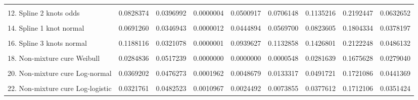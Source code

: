 \documentclass[]{article}
\begin{document}
\begin{table}
\begin{tabular}[t]{lrrrrrrrr}
\cellcolor{gray!6}{11. Spline 1 knot odds} & \cellcolor{gray!6}{0.0602433} & \cellcolor{gray!6}{0.0377595} & \cellcolor{gray!6}{0.0004610} & \cellcolor{gray!6}{0.0331955} & \cellcolor{gray!6}{0.0461415} & \cellcolor{gray!6}{0.0743721} & \cellcolor{gray!6}{0.1809477} & \cellcolor{gray!6}{0.0410625}\\
12. Spline 2 knots odds & 0.0828374 & 0.0396992 & 0.0000004 & 0.0500917 & 0.0706148 & 0.1135216 & 0.2192447 & 0.0632652\\
\cellcolor{gray!6}{13. Spline 3 knots odds} & \cellcolor{gray!6}{0.0937702} & \cellcolor{gray!6}{0.0420449} & \cellcolor{gray!6}{0.0000052} & \cellcolor{gray!6}{0.0581364} & \cellcolor{gray!6}{0.0821832} & \cellcolor{gray!6}{0.1255993} & \cellcolor{gray!6}{0.2117141} & \cellcolor{gray!6}{0.0672824}\\
14. Spline 1 knot normal & 0.0691260 & 0.0346943 & 0.0000012 & 0.0444894 & 0.0569700 & 0.0823605 & 0.1804334 & 0.0378197\\
\cellcolor{gray!6}{15. Spline 2 knots normal} & \cellcolor{gray!6}{0.0933942} & \cellcolor{gray!6}{0.0319718} & \cellcolor{gray!6}{0.0000000} & \cellcolor{gray!6}{0.0682231} & \cellcolor{gray!6}{0.0852159} & \cellcolor{gray!6}{0.1164045} & \cellcolor{gray!6}{0.2005479} & \cellcolor{gray!6}{0.0480608}\\
16. Spline 3 knots normal & 0.1188116 & 0.0321078 & 0.0000001 & 0.0939627 & 0.1132858 & 0.1426801 & 0.2122248 & 0.0486132\\
\cellcolor{gray!6}{17. Mixture cure Weibull} & \cellcolor{gray!6}{0.0274205} & \cellcolor{gray!6}{0.0519801} & \cellcolor{gray!6}{0.0000000} & \cellcolor{gray!6}{0.0000000} & \cellcolor{gray!6}{0.0000059} & \cellcolor{gray!6}{0.0191609} & \cellcolor{gray!6}{0.1672892} & \cellcolor{gray!6}{0.0189217}\\
18. Non-mixture cure Weibull & 0.0284836 & 0.0517239 & 0.0000000 & 0.0000000 & 0.0000548 & 0.0281639 & 0.1675628 & 0.0279040\\
\cellcolor{gray!6}{19. Mixture cure Log-normal} & \cellcolor{gray!6}{0.0386248} & \cellcolor{gray!6}{0.0496451} & \cellcolor{gray!6}{0.0001478} & \cellcolor{gray!6}{0.0035974} & \cellcolor{gray!6}{0.0128314} & \cellcolor{gray!6}{0.0569406} & \cellcolor{gray!6}{0.1684663} & \cellcolor{gray!6}{0.0533108}\\
20. Non-mixture cure Log-normal & 0.0369202 & 0.0476273 & 0.0001962 & 0.0048679 & 0.0133317 & 0.0491721 & 0.1721086 & 0.0441369\\
\cellcolor{gray!6}{21. Mixture cure Log-logistic} & \cellcolor{gray!6}{0.0336695} & \cellcolor{gray!6}{0.0485634} & \cellcolor{gray!6}{0.0012991} & \cellcolor{gray!6}{0.0028998} & \cellcolor{gray!6}{0.0085638} & \cellcolor{gray!6}{0.0419015} & \cellcolor{gray!6}{0.1712400} & \cellcolor{gray!6}{0.0388233}\\
22. Non-mixture cure Log-logistic & 0.0321761 & 0.0482523 & 0.0010967 & 0.0024492 & 0.0073855 & 0.0377612 & 0.1712106 & 0.0351424\\
\bottomrule
\end{tabular}
\end{table}
\end{document}
